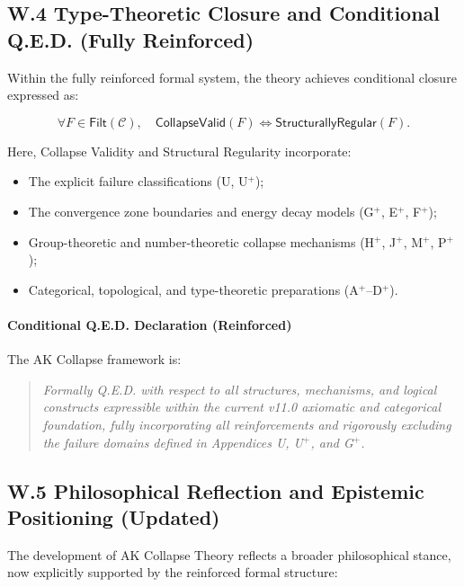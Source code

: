 \documentclass[11pt]{article}
\begin{document}
\subsection*{W.4 Type-Theoretic Closure and Conditional Q.E.D. (Fully Reinforced)}

Within the fully reinforced formal system, the theory achieves conditional closure expressed as:

\[
\forall F \in \mathsf{Filt}(\mathcal{C}), \quad \mathsf{CollapseValid}(F) \iff \mathsf{StructurallyRegular}(F).
\]

Here, Collapse Validity and Structural Regularity incorporate:

\begin{itemize}
    \item The explicit failure classifications (U, U$^{+}$);
    \item The convergence zone boundaries and energy decay models (G$^{+}$, E$^{+}$, F$^{+}$);
    \item Group-theoretic and number-theoretic collapse mechanisms (H$^{+}$, J$^{+}$, M$^{+}$, P$^{+}$);
    \item Categorical, topological, and type-theoretic preparations (A$^{+}$–D$^{+}$).
\end{itemize}

\paragraph{Conditional Q.E.D. Declaration (Reinforced)}  
The AK Collapse framework is:

\begin{quote}
\textit{Formally Q.E.D. with respect to all structures, mechanisms, and logical constructs expressible within the current v11.0 axiomatic and categorical foundation, fully incorporating all reinforcements and rigorously excluding the failure domains defined in Appendices U, U$^{+}$, and G$^{+}$.}
\end{quote}

\subsection*{W.5 Philosophical Reflection and Epistemic Positioning (Updated)}

The development of AK Collapse Theory reflects a broader philosophical stance, now explicitly supported by the reinforced formal structure:
\end{document}
